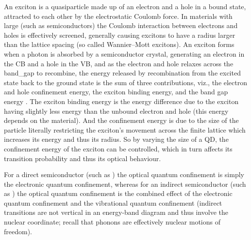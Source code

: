 \documentclass[webedition,openright,titles,swedish,english]{LuaUUThesis}\usepackage[]{graphicx}\usepackage[]{xcolor}
\newcommand{\viz}{viz.}
\newcommand{\namely}{\viz}
\begin{document}
An exciton is a quasiparticle made up of an electron and a hole in a bound state,
attracted to each other by the electrostatic Coulomb force.
In materials with large 
(such as semiconductors) the Coulomb interaction between electrons and holes
is effectively screened, generally causing excitons to have a radius larger than
the lattice spacing (so called Wannier--Mott excitons).
An exciton forms when a photon is absorbed by a semiconductor crystal,
generating an electron in the \gls{CB} and a hole in the \gls{VB},
and as the electron and hole relaxes across the \gls{band_gap} to recombine, the
energy released by recombination from the excited state back to the ground state
is the sum of three contributions, \namely,
the electron and hole confinement energy,
the exciton binding energy,
and the band gap energy \cite{Abdellah2015}.
%
The exciton binding energy is the energy difference due to the exciton
having slightly less energy than the unbound electron and hole
(this energy depends on the material).
And the confinement energy is due to the size of the particle literally
restricting the exciton's movement across the finite lattice which increases
its energy and thus its radius.
So by varying the size of a \gls{QD}, the confinement energy of the exciton
can be controlled, which in turn affects its transition probability and thus
its optical behaviour.

For a direct semiconductor (such as \ZnO) the optical quantum confinement is simply
the electronic quantum confinement, whereas for an indirect semiconductor (such as \hematite)
the optical quantum confinement is the combined effect of the electronic quantum confinement
and the vibrational quantum confinement \cite{Edvinsson2018}
(indirect transitions are not vertical in an energy-band diagram and thus involve
the nuclear coordinate; recall that phonons are effectively nuclear motions of freedom).
\end{document}
